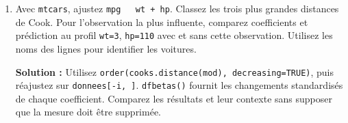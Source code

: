 \documentclass[letterpaper,11pt]{article}
\newcommand{\prof}[1]{\ifdefined\avecsolutions\par{\color{blue}\textbf{Solution :} #1}\par\fi}
\begin{document}
\begin{enumerate}[leftmargin=*,wide,label=\bfseries Exercice \arabic*:]
\prof{Vérifier saisie, mesure, unités, population ciblée, forme du modèle, levier et résidus. Pour une mesure valide, présenter les ajustements avec et sans l'observation, expliquer les changements et motiver le modèle utilisé. Un seuil de Cook n'est pas une justification automatique de retrait.}
\item Avec \texttt{mtcars}, ajustez \texttt{mpg \string~ wt + hp}. Classez les trois plus grandes distances de Cook. Pour l'observation la plus influente, comparez coefficients et prédiction au profil \texttt{wt=3}, \texttt{hp=110} avec et sans cette observation. Utilisez les noms des lignes pour identifier les voitures.
\prof{Utilisez \texttt{order(cooks.distance(mod), decreasing=TRUE)}, puis réajustez sur \texttt{donnees[-i, ]}. \texttt{dfbetas()} fournit les changements standardisés de chaque coefficient. Comparez les résultats et leur contexte sans supposer que la mesure doit être supprimée.}
\end{enumerate}
\end{document}
